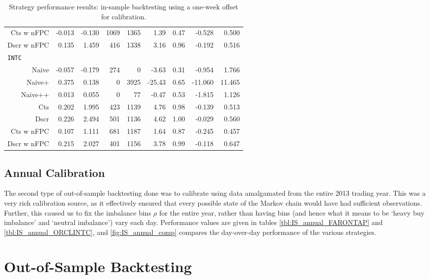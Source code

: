 \begin{table}
\begin{tabular}{@{} *{9}{r} @{}}
Cts w nFPC & -0.013 & -0.130 & 1069 & 1365 & 1.39 & 0.47 & -0.528 & 0.500 \\ 
Dscr w nFPC & 0.135 & 1.459 & 416 & 1338 & 3.16 & 0.96 & -0.192 & 0.516 \\[2ex]
\multicolumn{9}{l}{\texttt{INTC}} \\ 
Naive & -0.057 & -0.179 & 274 & 0 & -3.63 & 0.31 & -0.954 & 1.766 \\ 
Naive+ & 0.375 & 0.138 & 0 & 3925 & -25.43 & 0.65 & -11.060 & 11.465 \\ 
Naive++ & 0.013 & 0.055 & 0 & 77 & -0.47 & 0.53 & -1.815 & 1.126 \\ 
Cts & 0.202 & 1.995 & 423 & 1139 & 4.76 & 0.98 & -0.139 & 0.513 \\ 
Dscr & 0.226 & 2.494 & 501 & 1136 & 4.62 & 1.00 & -0.029 & 0.560 \\ 
Cts w nFPC & 0.107 & 1.111 & 681 & 1187 & 1.64 & 0.87 & -0.245 & 0.457 \\ 
Dscr w nFPC & 0.215 & 2.027 & 401 & 1156 & 3.78 & 0.99 & -0.118 & 0.647 \\ 
\bottomrule
\end{tabular}
\caption{Strategy performance results: in-sample backtesting using a one-week offset for calibration.}
\label{tbl:IS_week}
\end{table}

\FloatBarrier
\subsection{Annual Calibration}
The second type of out-of-sample backtesting done was to calibrate using data amalgamated from the entire 2013 trading year. This was a very rich calibration source, as it effectively ensured that every possible state of the Markov chain would have had sufficient observations. Further, this caused us to fix the imbalance bins $\rho$ for the entire year, rather than having bins (and hence what it means to be `heavy buy imbalance' and `neutral imbalance') vary each day. Performance values are given in tables \autoref{tbl:IS_annual_FARONTAP} and \autoref{tbl:IS_annual_ORCLINTC}, and \autoref{fig:IS_annual_comp} compares the day-over-day performance of the various strategies. 


\FloatBarrier
\section{Out-of-Sample Backtesting}